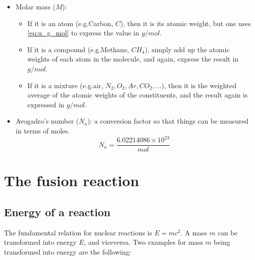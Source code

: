 \documentclass[a4paper,11pt]{article}
\begin{document}
\begin{itemize}
\item Molar mass ($M$): 
\begin{itemize}
    \item If it is an atom (e.g.\@ Carbon, $C$), then it is its atomic weight, but one uses \cref{eq:u_g_mol} to express the value in $g/mol$. 
    \item If it is a compound (e.g.\@ Methane, $CH_4$), simply add up the atomic weights of each atom in the molecule, and again, express the result in $g/mol$.
    \item If it is a mixture (e.g.\@ air, $N_2,O_2,Ar,CO_2,...$), then it is the weighted average of the atomic weights of the constituents, and the result again is expressed in $g/mol$.
\end{itemize}

\item Avogadro's number ($N_a$): a conversion factor so that things can be measured in terms of moles. 
\begin{equation}
    N_a = \frac{6.02214086 \times 10^{23}}{mol} 
\end{equation}

\end{itemize}
\section{The fusion reaction}
\subsection{Energy of a reaction}
The fundamental relation for nuclear reactions is $E = m c^2$. A mass $m$ can be transformed into energy $E$, and viceversa. Two examples for mass $m$ being transformed into energy are the following:
\end{document}
